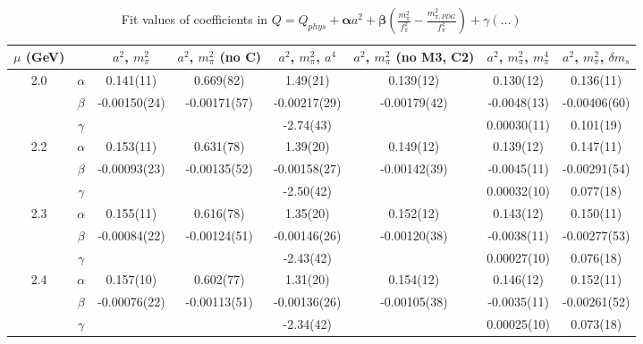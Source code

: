 \documentclass[12pt]{extarticle}
\begin{document}
\begin{table}[h!]
\begin{center}
\begin{tabular}{|c c|c|c|c|c|c|c|}
\hline
$\mu$ (GeV) &  & $a^2$, $m_\pi^2$& $a^2$, $m_\pi^2$ (no C)& $a^2$, $m_\pi^2$, $a^4$& $a^2$, $m_\pi^2$ (no M3, C2)& $a^2$, $m_\pi^2$, $m_\pi^4$& $a^2$, $m_\pi^2$, $\delta m_s$\\
\hline
\multirow{3}{0.5in}{2.0} & $\alpha$ & 0.141(11)& 0.669(82)& 1.49(21)& 0.139(12)& 0.130(12)& 0.136(11)\\
 & $\beta$ & -0.00150(24)& -0.00171(57)& -0.00217(29)& -0.00179(42)& -0.0048(13)& -0.00406(60)\\
 & $\gamma$ &  &  & -2.74(43)&  & 0.00030(11)& 0.101(19)\\
\hline
\multirow{3}{0.5in}{2.2} & $\alpha$ & 0.153(11)& 0.631(78)& 1.39(20)& 0.149(12)& 0.139(12)& 0.147(11)\\
 & $\beta$ & -0.00093(23)& -0.00135(52)& -0.00158(27)& -0.00142(39)& -0.0045(11)& -0.00291(54)\\
 & $\gamma$ &  &  & -2.50(42)&  & 0.00032(10)& 0.077(18)\\
\hline
\multirow{3}{0.5in}{2.3} & $\alpha$ & 0.155(11)& 0.616(78)& 1.35(20)& 0.152(12)& 0.143(12)& 0.150(11)\\
 & $\beta$ & -0.00084(22)& -0.00124(51)& -0.00146(26)& -0.00120(38)& -0.0038(11)& -0.00277(53)\\
 & $\gamma$ &  &  & -2.43(42)&  & 0.00027(10)& 0.076(18)\\
\hline
\multirow{3}{0.5in}{2.4} & $\alpha$ & 0.157(10)& 0.602(77)& 1.31(20)& 0.154(12)& 0.146(12)& 0.152(11)\\
 & $\beta$ & -0.00076(22)& -0.00113(51)& -0.00136(26)& -0.00105(38)& -0.0035(11)& -0.00261(52)\\
 & $\gamma$ &  &  & -2.34(42)&  & 0.00025(10)& 0.073(18)\\
\hline
\end{tabular}
\caption{Fit values of coefficients in $Q = Q_{phys} + \mathbf{\alpha} a^2 + \mathbf{\beta}\left(\frac{m_\pi^2}{f_\pi^2}-\frac{m_{\pi,PDG}^2}{f_\pi^2}\right) + \gamma(\ldots)$}
\end{center}
\end{table}






\end{document}
